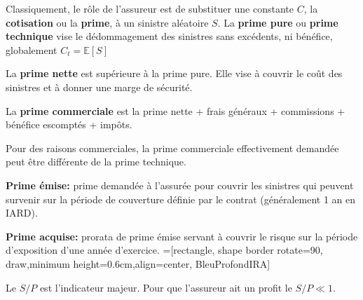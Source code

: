 \begin{f}
Classiquement, le rôle de l'assureur est de substituer une constante \(C\), la \textbf{cotisation} ou la \textbf{prime}, à un sinistre aléatoire \(S\).
La \textbf{prime pure} ou \textbf{prime technique} vise 
le dédommagement des sinistres sans excédents, ni bénéfice, globalement \(C_t = \mathbb{E}[S]\)
	
	La \textbf{prime nette} est supérieure à la prime pure. Elle vise à couvrir le coût des sinistres et à donner une marge de sécurité.
	
	La \textbf{prime commerciale} est la prime nette + frais généraux + commissions + bénéfice escomptés + impôts.
	
	Pour des raisons commerciales, la prime commerciale effectivement demandée peut être différente de la prime technique.

	\textbf{Prime émise:} prime demandée à l'assurée pour couvrir les sinistres qui peuvent survenir sur la
période de couverture définie par le contrat (généralement 1 an en IARD).

\textbf{Prime acquise:} prorata de prime émise servant à couvrir le risque sur la période d'exposition
d'une année d'exercice.
=[rectangle, shape border rotate=90, draw,minimum height=0.6cm,align=center, BleuProfondIRA]

\resizebox{\linewidth}{!}
{
}
Le \(S/P\) est l'indicateur majeur. Pour que l'assureur ait un profit le \(S/P\ll 1\). 
\end{f}

